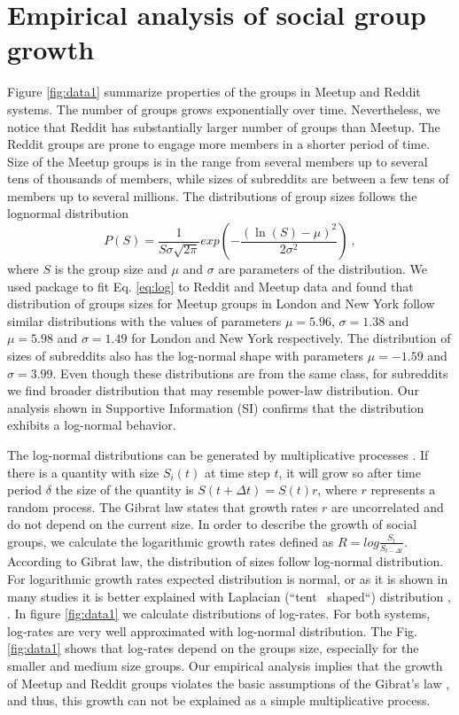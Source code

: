 \section{Empirical analysis of social group growth \label{sec:emp}}


Figure \ref{fig:data1} summarize properties of the groups in Meetup and Reddit systems. The number of groups grows exponentially over time. Nevertheless, we notice that Reddit has substantially larger number of groups than Meetup. The Reddit groups are prone to engage more members in a shorter period of time. Size of the Meetup groups is in the range from several members up to several tens of thousands of members, while sizes of subreddits are between a few tens of members up to several millions. The distributions of group sizes follows the lognormal distribution
\begin{equation}
P(S)=\frac{1}{S\sigma\sqrt{2\pi}}exp(-\frac{(\ln(S)-\mu)^{2}}{2\sigma^{2}})
\label{eq:log} \ ,
\end{equation}
where $S$ is the group size and $\mu$ and $\sigma$ are parameters of the distribution. We used package \cite{powerlaw} to fit Eq. \ref{eq:log} to Reddit and Meetup data and found that distribution of groups sizes for Meetup groups in London and New York follow similar distributions with the values of parameters $\mu= 5.96$, $\sigma = 1.38$ and $\mu=5.98$ and $\sigma=1.49$ for London and New York respectively. The distribution of sizes of subreddits also has the log-normal shape with parameters $\mu= -1.59$ and $\sigma = 3.99$. Even though these distributions are from the same class, for subreddits we find broader distribution that may resemble power-law distribution. Our analysis shown in Supportive Information (SI) confirms that the distribution exhibits a log-normal behavior.  

The log-normal distributions can be generated by multiplicative processes \cite{mitzenmacher2004brief}. If there is a quantity with size $S_i(t)$ at time step $t$, it will grow so after time period $\delta$ the size of the quantity is $S(t+\Delta t) = S(t) r$, where $r$ represents a random process. The Gibrat law states that growth rates $r$ are uncorrelated and do not depend on the current size. In order to describe the growth of social groups, we calculate the logarithmic growth rates defined as $R = log\frac{S_t}{S_{t-\Delta t}}$. According to Gibrat law, the distribution of sizes follow log-normal distribution. For logarithmic growth rates expected distribution is normal, or as it is shown in many studies it is better explained with Laplacian (“tent  shaped“) distribution \cite{mondani2014fat}, \cite{fu2005growth}. In figure \ref{fig:data1} we calculate distributions of log-rates. For both systems, log-rates are very well approximated with log-normal distribution. The Fig. \ref{fig:data1} shows that log-rates depend on the groups size, especially for the smaller and medium size groups. Our empirical analysis implies that the growth of Meetup and Reddit groups violates the basic assumptions of the Gibrat's law \cite{frasco2014spatially, qian2014origin}, and thus, this growth can not be explained as a simple multiplicative process.\\


